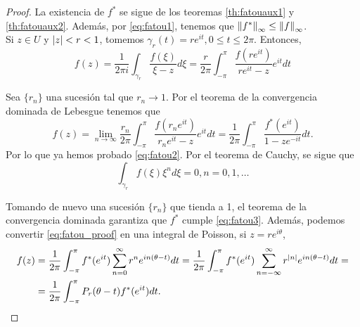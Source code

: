 \begin{proof}
    La existencia de $f^*$ se sigue de los teoremas \ref{th:fatouaux1} y \ref{th:fatouaux2}. %
    Además, por \eqref{eq:fatou1}, tenemos que $\left\lVert f^*\right\rVert_{\infty} \leq \left\lVert f\right\rVert_{\infty}$. \\

    Si $z \in U$ y $\left\lvert z\right\rvert < r < 1$, tomemos $\gamma_r(t) = r e^{it}, 0 \leq t \leq 2\pi$. Entonces,
    \begin{equation*}
        f(z) = \dfrac{1}{2 \pi i} \int_{\gamma_r} \dfrac{f(\xi)}{\xi - z} d\xi =
        \dfrac{r}{2 \pi} \int_{-\pi}^{\pi} \dfrac{f(re^{it})}{re^{it} - z}e^{it} dt
    \end{equation*}

    Sea $\{r_n\}$ una sucesión tal que $r_n \to 1$. Por el teorema de la convergencia dominada de Lebesgue tenemos que %
    \begin{equation}
        \label{eq:fatou_proof}
        f(z) = \lim_{n \to \infty} \frac{r_n}{2 \pi} \int_{-\pi}^{\pi} \frac{f(r_n e^{it})}{r_n e^{it} - z} e^{it} dt =  \dfrac{1}{2 \pi} \int_{-\pi}^{\pi} \dfrac{f^* (e^{it})}{1 - ze^{-it}} dt.
    \end{equation}
    Por lo que ya hemos probado \eqref{eq:fatou2}. Por el teorema de Cauchy, se sigue que
    \begin{equation*}
        \int_{\gamma_r} f(\xi)\xi^n d\xi = 0, n = 0, 1, \dots
    \end{equation*}

    Tomando de nuevo una sucesión $\{r_n\}$ que tienda a 1, el teorema de la convergencia dominada garantiza que $f^*$ cumple \eqref{eq:fatou3}. Además, podemos convertir \eqref{eq:fatou_proof} en una integral de Poisson, si $z = re^{i \theta}$,
    \begin{equation}
        \label{eq:fatou_poisson}
         \begin{split}
             f(z) & = \dfrac{1}{2 \pi} \int_{- \pi}^{\pi} f^*(e^{it}) \sum_{n=0}^{\infty} r^n e^{in(\theta - t)} dt =  \dfrac{1}{2 \pi} \int_{- \pi}^{\pi} f^*(e^{it}) \sum_{n=-\infty}^{\infty} r^{\left\lvert n\right\rvert} e^{in(\theta - t)} dt = \\
                  & =  \dfrac{1}{2 \pi} \int_{- \pi}^{\pi} P_r(\theta - t) f^*(e^{it}) dt.
         \end{split}
    \end{equation}


\end{proof}
